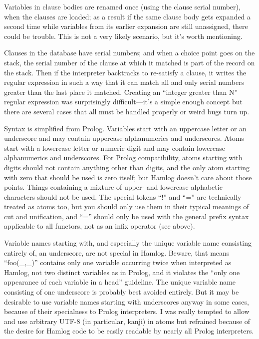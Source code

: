 \documentclass[14pt]{extarticle}
\begin{document}
Variables in clause bodies are renamed once (using the clause serial
number), when the clauses are loaded; as a result if the same clause body
gets expanded a second time while variables from its earlier expansion are
still unassigned, there could be trouble.  This is not a very likely
scenario, but it's worth mentioning.

Clauses in the database have serial numbers; and when a choice point goes on
the stack, the serial number of the clause at which it matched is
part of the record on the stack.  Then if the interpreter backtracks to
re-satisfy a clause, it writes the regular expression in such a way that it
can match all and only serial numbers greater than the last place it
matched.  Creating an ``integer greater than N'' regular expression was
surprisingly difficult---it's a simple enough concept but there are several
cases that all must be handled properly or weird bugs turn up.

Syntax is simplified from Prolog.  Variables start with an uppercase letter
or an underscore and may contain uppercase alphanumerics and underscores. 
Atoms start with a lowercase letter or numeric digit and may contain
lowercase alphanumerics and underscores.  For Prolog compatibility, atoms
starting with digits should not contain anything other than digits, and the
only atom starting with zero that should be used is zero itself; but Hamlog
doesn't care about those points.  Things containing a mixture of
upper- and lowercase alphabetic characters should not be used.  The special
tokens ``!'' and ``='' are technically treated as atoms too, but you should
only use them in their typical meanings of cut and unification, and ``=''
should only be used with the general prefix syntax applicable to all
functors, not as an infix operator (see above).

Variable names starting with, and especially the unique variable name
consisting entirely of, an underscore, are not special in Hamlog.  Beware,
that means ``foo(\_,\_)'' contains only one variable occurring twice when
interpreted as Hamlog, not two distinct variables as in Prolog, and it
violates the ``only one appearance of each variable in a head'' guideline. 
The unique variable name consisting of one underscore is probably best
avoided entirely.  But it may be desirable to use variable names starting
with underscores anyway in some cases, because of their specialness to
Prolog interpreters.  I was really tempted to allow and use arbitrary UTF-8
(in particular, kanji) in atoms but refrained because of the desire for
Hamlog code to be easily readable by nearly all Prolog interpreters.
\end{document}
